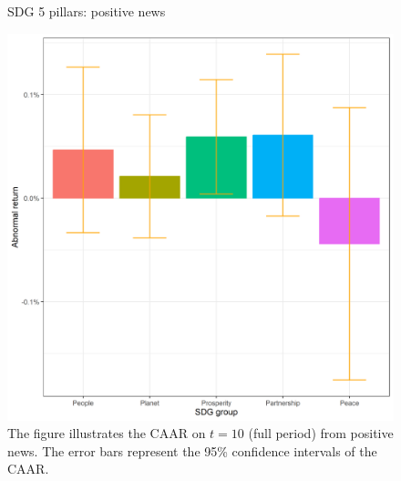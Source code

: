 \begin{figure} [H]
    \centering
    \caption{SDG 5 pillars: positive news}
    \includegraphics[scale=0.6]{Projekt/1.Figures analysis/ST_positive_sdg_bar_groups_0.png}
    \caption*{\footnotesize The figure illustrates the CAAR on $t = 10$ (full period) from positive news. The error bars represent the 95\% confidence intervals of the CAAR.}
    \label{fig:ST_pos_bar}
\end{figure}
